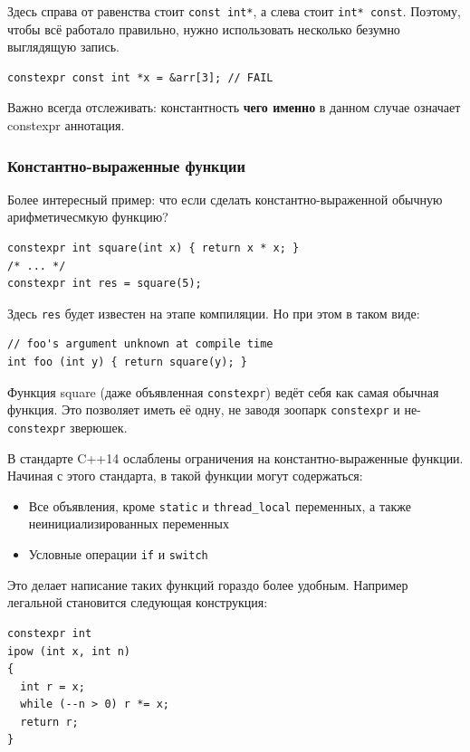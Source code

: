 \documentclass[a4paper,12pt,oneside]{article}
\begin{document}
Здесь справа от равенства стоит \lstinline!const int*!, а слева стоит \lstinline!int* const!. Поэтому, чтобы всё работало правильно, нужно использовать несколько безумно выглядящую запись.

\begin{lstlisting}
constexpr const int *x = &arr[3]; // FAIL
\end{lstlisting}

Важно всегда отслеживать: константность \textbf{чего именно} в данном случае означает constexpr аннотация.

\subsubsection{Константно-выраженные функции}\label{Constexpr:functions}

Более интересный пример: что если сделать константно-выраженной обычную арифметичесмкую функцию?

\begin{lstlisting}
constexpr int square(int x) { return x * x; }
/* ... */
constexpr int res = square(5);
\end{lstlisting}

Здесь \lstinline!res! будет известен на этапе компиляции. Но при этом в таком виде:

\begin{lstlisting}
// foo's argument unknown at compile time
int foo (int y) { return square(y); }
\end{lstlisting}

Функция square (даже объявленная \lstinline!constexpr!) ведёт себя как самая обычная функция. Это позволяет иметь её одну, не заводя зоопарк \lstinline!constexpr! и не-\lstinline!constexpr! зверюшек.

В стандарте C++14 ослаблены ограничения на константно-выраженные функции. Начиная с этого стандарта, в такой функции могут содержаться:

\begin{itemize}
\item Все объявления, кроме \lstinline!static! и \lstinline!thread_local! переменных, а также неинициализированных переменных
\item Условные операции \lstinline!if! и \lstinline!switch!
\end{itemize}

Это делает написание таких функций гораздо более удобным. Например легальной становится следующая конструкция:

\begin{lstlisting}
constexpr int 
ipow (int x, int n) 
{ 
  int r = x;
  while (--n > 0) r *= x;
  return r;
}
\end{lstlisting}
\end{document}
